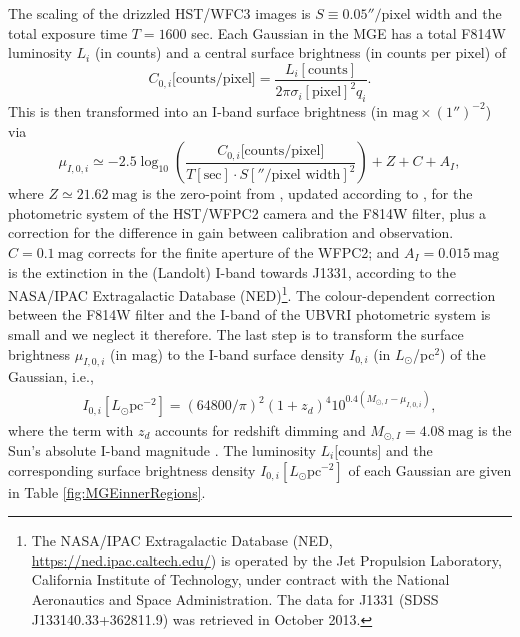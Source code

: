 \documentclass[useAMS,usenatbib]{mnras}
\begin{document}
The scaling of the drizzled HST/WFC3 images is  $S \equiv 0.05''/\text{pixel width}$ and the total exposure time $T = 1600$ sec. Each Gaussian in the MGE has a total F814W luminosity $L_i$ (in counts) and a central surface brightness (in counts per pixel) of
\begin{equation}
C_{0,i}\text{[counts/pixel]} = \frac{L_i[\text{counts}]}{2\pi \sigma_i[\text{pixel}]^2 q_i}.
\end{equation}
This is then transformed into an I-band surface brightness (in $\text{mag}\times(1'')^{-2}$) via
\begin{equation}
\mu_{I,0,i} \simeq -2.5 \log_{10}\left( \frac{C_{0,i}\text{[counts/pixel]}}{T[\text{sec}] \cdot S[''/\text{pixel width}]^2}\right) + Z + C + A_I, \label{eq:muI_}
\end{equation}
where $Z\simeq21.62~\text{mag}$ is the zero-point from \citet{Holtzman}, updated according to \citet{Dolphin,DolphinNew}, for the photometric system of the HST/WFPC2 camera and the F814W filter, plus a correction for the difference in gain between calibration and observation. $C= 0.1~\text{mag}$ corrects for the finite aperture of the WFPC2; and $A_I =0.015~\text{mag}$ is the extinction in the (Landolt) I-band towards J1331, according to the NASA/IPAC Extragalactic Database (NED)\footnote{The NASA/IPAC Extragalactic Database (NED, \url{https://ned.ipac.caltech.edu/}) is operated by the Jet Propulsion Laboratory, California Institute of Technology, under contract with the National Aeronautics and Space Administration. The data for J1331 (SDSS J133140.33+362811.9) was retrieved in October 2013.}. The colour-dependent correction between the F814W filter and the I-band of the UBVRI photometric system is  small \citep{Holtzman} and we neglect it therefore. The last step is to transform the surface brightness $\mu_{I,0,i}$ (in mag) to the I-band surface density $I_{0,i}$ (in $L_\odot$/pc$^2$) of the Gaussian, i.e.,
\begin{eqnarray}
I_{0,i}[L_\odot \text{pc}^{-2}] = \left( 64800/\pi\right)^2 \left(1+z_d \right)^4 10^{0.4\left(M_{\odot,I}-\mu_{I,0,i} \right)},
\end{eqnarray}
where the term with $z_d$ accounts for redshift dimming and $M_{\odot,I}=4.08~\text{mag}$ is the Sun's absolute I-band magnitude \citep{1998gaas.book.....B}. The luminosity $L_i$[counts] and the corresponding surface brightness density $I_{0,i} [L_\odot \text{pc}^{-2}]$ of each Gaussian are given in Table \ref{fig:MGEinnerRegions}.
\end{document}
